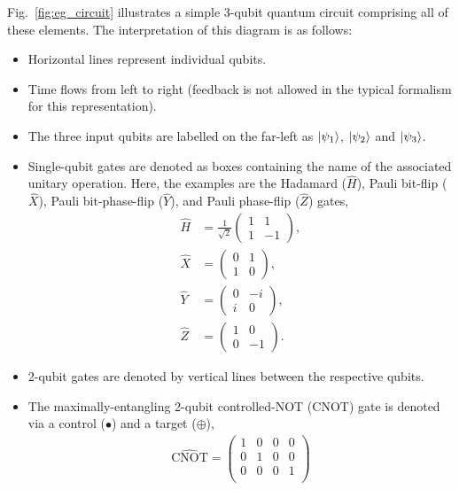 Fig.~\ref{fig:eg_circuit} illustrates a simple 3-qubit quantum circuit comprising all of these elements. The interpretation of this diagram is as follows:
\begin{itemize}
	\item Horizontal lines represent individual qubits.
	\item Time flows from left to right (feedback is not allowed in the typical formalism for this representation).
	\item The three input qubits are labelled on the far-left as $|\psi_1\rangle$, $|\psi_2\rangle$ and $|\psi_3\rangle$.
	\item Single-qubit gates are denoted as boxes containing the name of the associated unitary operation. Here, the examples are the Hadamard ($\hat{H}$), Pauli bit-flip ($\hat{X}$), Pauli bit-phase-flip ($\hat{Y}$), and Pauli phase-flip ($\hat{Z}$) gates,
	\begin{align}
		\hat{H} &= \frac{1}{\sqrt{2}}\begin{pmatrix}
		1 & 1 \\
		1 & -1
		\end{pmatrix},\nonumber \\
		\hat{X} &= \begin{pmatrix}
		0 & 1 \\
		1 & 0
		\end{pmatrix},\nonumber \\
		\hat{Y} &= \begin{pmatrix}
		0 & -i \\
		i & 0
		\end{pmatrix},\nonumber \\
		\hat{Z} &= \begin{pmatrix}
		1 & 0 \\
		0 & -1
		\end{pmatrix}.
	\end{align}
	\item 2-qubit gates are denoted by vertical lines between the respective qubits.
	\item The maximally-entangling 2-qubit controlled-NOT (CNOT) gate is denoted via a control ($\bullet$) and a target ($\oplus$),
	\begin{align}
		\hat{\mathrm{CNOT}}=\begin{pmatrix}
		1 & 0 & 0 & 0 \\
		0 & 1 & 0 & 0 \\
		0 & 0 & 0 & 1 \\

\end{pmatrix}
\end{align}
\end{itemize}
